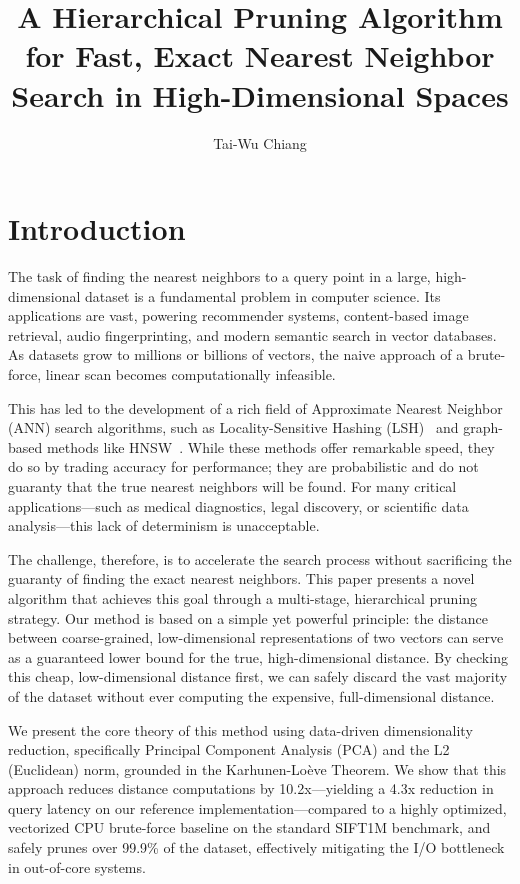 \documentclass[sigconf]{acmart}
\title{A Hierarchical Pruning Algorithm for Fast, Exact Nearest Neighbor Search in High-Dimensional Spaces}
\author{Tai-Wu Chiang}
\affiliation{%
  \institution{twchiang@utexas.edu}
  \city{California}
  \country{USA}
}
\begin{document}
\maketitle


\section{Introduction}

The task of finding the nearest neighbors to a query point in a large, high-dimensional dataset is a fundamental problem in computer science. Its applications are vast, powering recommender systems, content-based image retrieval, audio fingerprinting, and modern semantic search in vector databases. As datasets grow to millions or billions of vectors, the naive approach of a brute-force, linear scan becomes computationally infeasible.

This has led to the development of a rich field of Approximate Nearest Neighbor (ANN) search algorithms, such as Locality-Sensitive Hashing (LSH)~\cite{gionis1999similarity} and graph-based methods like HNSW~\cite{malkov2018efficient}. While these methods offer remarkable speed, they do so by trading accuracy for performance; they are probabilistic and do not guaranty that the true nearest neighbors will be found. For many critical applications—such as medical diagnostics, legal discovery, or scientific data analysis—this lack of determinism is unacceptable.

The challenge, therefore, is to accelerate the search process without sacrificing the guaranty of finding the exact nearest neighbors. This paper presents a novel algorithm that achieves this goal through a multi-stage, hierarchical pruning strategy. Our method is based on a simple yet powerful principle: the distance between coarse-grained, low-dimensional representations of two vectors can serve as a guaranteed lower bound for the true, high-dimensional distance. By checking this cheap, low-dimensional distance first, we can safely discard the vast majority of the dataset without ever computing the expensive, full-dimensional distance.

We present the core theory of this method using data-driven dimensionality reduction, specifically Principal Component Analysis (PCA) and the L2 (Euclidean) norm, grounded in the Karhunen-Loève Theorem. We show that this approach reduces distance computations by 10.2x---yielding a 4.3x reduction in query latency on our reference implementation---compared to a highly optimized, vectorized CPU brute-force baseline on the standard SIFT1M benchmark, and safely prunes over 99.9\% of the dataset, effectively mitigating the I/O bottleneck in out-of-core systems.
\end{document}
